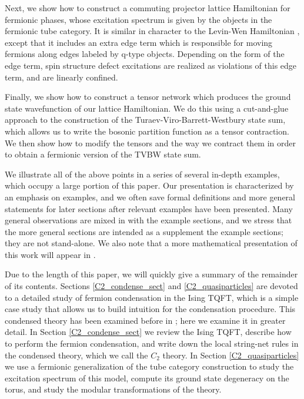 Next,  we show how to construct a commuting projector lattice Hamiltonian 
for fermionic phases, whose excitation spectrum is given by the objects in the fermionic tube category.  
It is similar in character to the Levin-Wen Hamiltonian \cite{levin2005}, 
except that it includes an extra edge term which is responsible for moving fermions along
edges labeled by q-type objects. 
Depending on the form of the edge term, spin structure defect excitations 
are realized as violations of this edge term, and are linearly confined. 

Finally, we show how to construct a tensor network which produces the ground state 
wavefunction of our lattice Hamiltonian. We do this using a cut-and-glue approach to 
the construction of the Turaev-Viro-Barrett-Westbury state sum, which allows us to write the bosonic partition function
as a tensor contraction. We then show how to modify the tensors 
and the way we contract them in order to obtain a fermionic version of the TVBW state sum.  

We illustrate all  of the above points in a series of several in-depth examples, which occupy a large portion 
of this paper.
Our presentation is characterized by an emphasis on examples, 
and we often save formal definitions and more general statements 
for later sections after relevant examples have been presented.  
Many general observations are mixed in with the example sections,
and we stress that the more general sections are intended as a supplement
the example sections; they are not stand-alone.
We also note that a more mathematical presentation of this work will appear in \cite{Kevin and scott's paper?}. 


Due to the length of this paper, we will quickly give a summary of the remainder  of its contents.
Sections \ref{C2_condense_sect} and \ref{C2_quasiparticles} are devoted to a detailed study of 
fermion condensation in the Ising TQFT, which is a simple case study that allows us to build intuition for the condensation procedure.
This condensed theory has been examined before in \cite{bhardwaj2016, kapustin2017}; 
here we examine it in greater detail. 
In Section \ref{C2_condense_sect} we review the Ising TQFT, describe how to perform the 
fermion condensation, and write down the local string-net rules in the condensed theory, 
which we call the $C_2$ theory. 
In Section \ref{C2_quasiparticles} we use a fermionic generalization of the tube category 
construction to study the excitation spectrum of this model, compute its ground state 
degeneracy on the torus, and study the modular transformations %
of the theory. 

